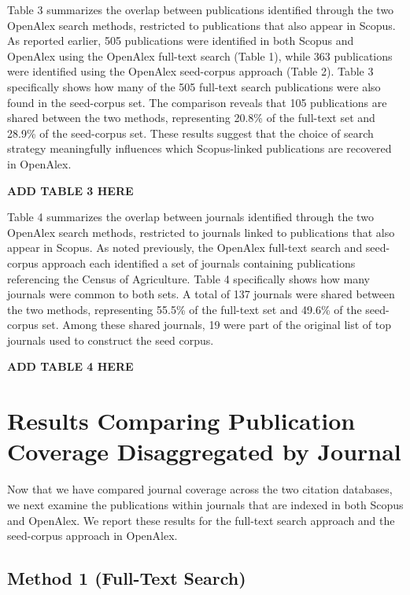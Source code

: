 \documentclass[
  letterpaper,
  DIV=11,
  numbers=noendperiod]{scrartcl}
\begin{document}
Table 3 summarizes the overlap between publications identified through
the two OpenAlex search methods, restricted to publications that also
appear in Scopus. As reported earlier, 505 publications were identified
in both Scopus and OpenAlex using the OpenAlex full-text search (Table
1), while 363 publications were identified using the OpenAlex
seed-corpus approach (Table 2). Table 3 specifically shows how many of
the 505 full-text search publications were also found in the seed-corpus
set. The comparison reveals that 105 publications are shared between the
two methods, representing 20.8\% of the full-text set and 28.9\% of the
seed-corpus set. These results suggest that the choice of search
strategy meaningfully influences which Scopus-linked publications are
recovered in OpenAlex.

\textbf{ADD TABLE 3 HERE}

Table 4 summarizes the overlap between journals identified through the
two OpenAlex search methods, restricted to journals linked to
publications that also appear in Scopus. As noted previously, the
OpenAlex full-text search and seed-corpus approach each identified a set
of journals containing publications referencing the Census of
Agriculture. Table 4 specifically shows how many journals were common to
both sets. A total of 137 journals were shared between the two methods,
representing 55.5\% of the full-text set and 49.6\% of the seed-corpus
set. Among these shared journals, 19 were part of the original list of
top journals used to construct the seed corpus.

\textbf{ADD TABLE 4 HERE}

\section{\texorpdfstring{\Large Results Comparing Publication Coverage
Disaggregated by
Journal}{Results Comparing Publication Coverage Disaggregated by Journal}}\label{results-comparing-publication-coverage-disaggregated-by-journal}

Now that we have compared journal coverage across the two citation
databases, we next examine the publications within journals that are
indexed in both Scopus and OpenAlex. We report these results for the
full-text search approach and the seed-corpus approach in OpenAlex.

\subsection{\texorpdfstring{\Large Method 1 (Full-Text
Search)}{Method 1 (Full-Text Search)}}\label{method-1-full-text-search-1}
\end{document}
